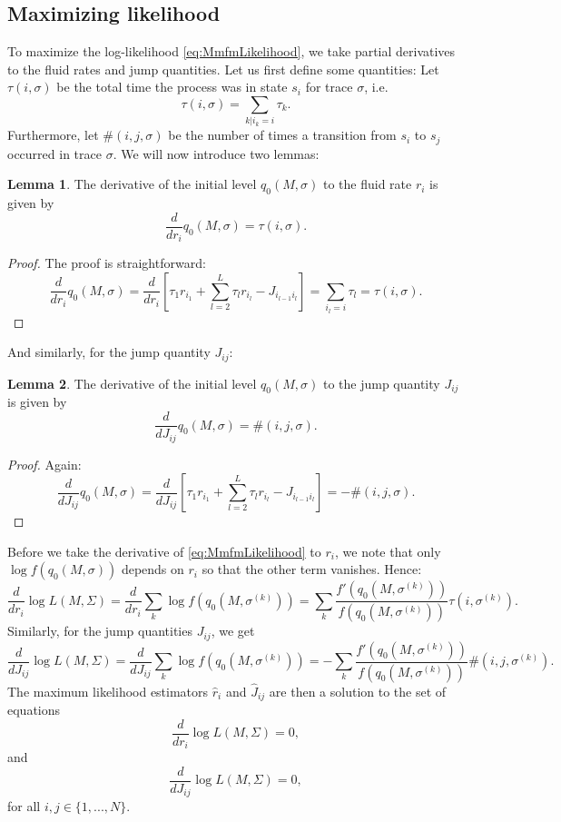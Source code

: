 \documentclass[a4paper]{thesis}
\theoremstyle{definition}
\newtheorem{lemma}{Lemma}[chapter]
\begin{document}
\subsection{Maximizing likelihood}
To maximize the log-likelihood \eqref{eq:MmfmLikelihood}, we take partial derivatives to the fluid rates and jump quantities.
Let us first define some quantities:
Let $\tau(i,\sigma)$ be the total time the process was in state $s_i$ for trace $\sigma$, i.e.
$$
\tau(i,\sigma)=\sum\limits_{k|i_k=i}\tau_k.
$$
Furthermore, let $\#(i,j,\sigma)$ be the number of times a transition from $s_i$ to $s_j$ occurred in trace $\sigma$.
We will now introduce two lemmas:
\begin{lemma}
	The derivative of the initial level $q_0(M,\sigma)$ to the fluid rate $r_i$ is given by
	\[
	\frac{d}{dr_i}q_0(M,\sigma)=\tau(i,\sigma).
	\]
	\begin{proof}
		The proof is straightforward:
		\[
		\frac{d}{dr_i}q_0(M,\sigma)=\frac{d}{dr_i}\left[\tau_1r_{i_1}+\sum\limits_{l=2}^{L}\tau_lr_{i_l}-J_{i_{l-1}i_l}\right]=\sum\limits_{i_l=i}\tau_l=\tau(i,\sigma).
		\]
	\end{proof}
\end{lemma}
And similarly, for the jump quantity $J_{ij}$:
\begin{lemma}
	The derivative of the initial level  $q_0(M,\sigma)$ to the jump quantity $J_{ij}$ is given by
	\[
	\frac{d}{dJ_{ij}}q_0(M,\sigma)=\#(i,j,\sigma).
	\]
	\begin{proof}
		Again:
		\[
		\frac{d}{dJ_{ij}}q_0(M,\sigma)=\frac{d}{dJ_{ij}}\left[\tau_1r_{i_1}+\sum\limits_{l=2}^{L}\tau_lr_{i_l}-J_{i_{l-1}i_l}\right]=-\#(i,j,\sigma).
		\]
	\end{proof}
\end{lemma}

Before we take the derivative of \eqref{eq:MmfmLikelihood} to $r_i$, we note that only $\log f(q_0(M,\sigma))$ depends on $r_i$ so that the other term vanishes.
Hence:
\[
\frac{d}{dr_i}\log L(M,\Sigma)
=\frac{d}{dr_i}\sum_k\log f(q_0(M,\sigma^{(k)}))=\sum_k\frac{f'(q_0(M,\sigma^{(k)}))}{f(q_0(M,\sigma^{(k)}))}\tau(i,\sigma^{(k)}).
\]
Similarly, for the jump quantities $J_{ij}$, we get
$$
\frac{d}{dJ_{ij}}\log L(M,\Sigma)=\frac{d}{dJ_{ij}}\sum_k\log f(q_0(M,\sigma^{(k)}))=-\sum_k\frac{f'(q_0(M,\sigma^{(k)}))}{f(q_0(M,\sigma^{(k)}))}\#(i,j,\sigma^{(k)}).
$$
The maximum likelihood estimators $\hat r_i$ and $\hat J_{ij}$ are then a solution to the set of equations 
\[
\frac{d}{dr_i}\log L(M,\Sigma)=0,
\]
and
\[
\frac{d}{dJ_{ij}}\log L(M,\Sigma)=0,
\]
for all $i,j\in\{1,...,N\}$.
\end{document}
